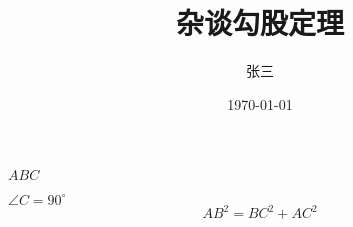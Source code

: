 \documentclass{article} %
\title{\heiti 杂谈勾股定理}%
\author{\kaishu 张三} %
\date{\today}
\newcommand\degree{^\circ } %
\begin{document}
  \maketitle
  $ABC$
  
  $\angle C=90\degree$
  	\begin{equation} %
  	AB^2 = BC^2 + AC^2
 	 \end{equation}
\end{document}
